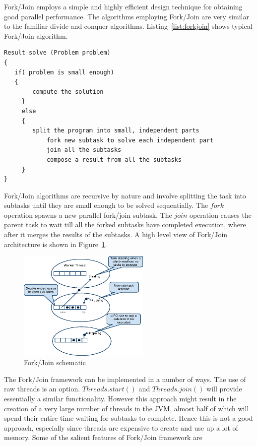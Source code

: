 \documentclass[conference]{IEEEtran}
\begin{document}
Fork/Join employs a simple and highly efficient design technique for obtaining good parallel performance. The algorithms employing Fork/Join are very similar to the familiar divide-and-conquer algorithms. Listing~\ref{list:forkjoin} shows typical Fork/Join algorithm. 

\begin{lstlisting}[caption={Typical Fork/Join algorithm}, label=list:forkjoin]
Result solve (Problem problem) 
{
   if( problem is small enough)
   {
	    compute the solution
	 }		 
	 else
	 {
	    split the program into small, independent parts
			fork new subtask to solve each independent part
			join all the subtasks
			compose a result from all the subtasks
	 }
}
\end{lstlisting}


Fork/Join algorithms are recursive by nature and involve splitting the task into subtasks until they are small enough to be solved sequentially. The $fork$ operation spawns a new parallel fork/join subtask. The $join$ operation causes the parent task to wait till all the forked subtasks have completed execution, where after it merges the results of the subtasks. A high level view of Fork/Join architecture is shown in Figure~\ref{fig:forkjoin}.

\begin{figure}[!t]
\centering
\includegraphics[width=2.5in]{forkjoin.eps}
\caption{Fork/Join schematic}
\label{fig:forkjoin}
\end{figure}

The Fork/Join framework can be implemented in a number of ways. The use of raw threads is an option. $Threads.start()$ and $Threads.join()$ will provide essentially a similar functionality. However this approach might result in the creation of a very large number of threads in the JVM, almost half of which will spend their entire time waiting for subtasks to complete. Hence this is not a good approach, especially since threads are expensive to create and use up a lot of memory. Some of the salient features of Fork/Join framework are
\end{document}
